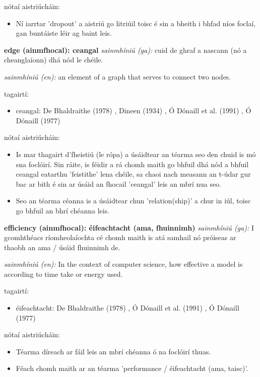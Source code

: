 \documentclass{article}
\begin{document}
nótaí aistriúcháin:
\begin{itemize}
	\item Ní iarrtar 'dropout' a aistriú go litriúil toisc é sin a bheith i bhfad níos foclaí, gan buntáiste léir ag baint leis.
\end{itemize}


\textbf{edge (ainmfhocal): ceangal}
\textit{sainmhíniú (ga):} cuid de ghraf a nascann (nó a cheanglaíonn) dhá nód le chéile.

\textit{sainmhíniú (en):} an element of a graph that serves to connect two nodes.

tagairtí:
\begin{itemize}
	\item ceangal: De Bhaldraithe (1978) \cite{de-bhaldraithe}, Dineen (1934) \cite{dineen}, Ó Dónaill et al. (1991) \cite{focloir-beag}, Ó Dónaill (1977) \cite{odonaill}
\end{itemize}

nótaí aistriúcháin:
\begin{itemize}
	\item Is mar thagairt d'fheistiú (le rópa) a úsáidtear an téarma seo den chuid is mó sna foclóirí. Sin ráite, is féidir a rá chomh maith go bhfuil dhá nód a bhfuil ceangal eatarthu 'feistithe' lena chéile, sa chaoi nach measann an t-údar gur bac ar bith é sin ar úsáid an fhocail 'ceangal' leis an mbrí nua seo.
	\item Seo an téarma céanna is a úsáidtear chun 'relation(ship)' a chur in iúl, toisc go bhfuil an bhrí chéanna leis.
\end{itemize}


\textbf{efficiency (ainmfhocal): éifeachtacht (ama, fhuinnimh)}
\textit{sainmhíniú (ga):} I gcomhthéacs ríomheolaíochta cé chomh maith is atá samhail nó próiseas ar thaobh an ama / úsáid fhuinnimh de.

\textit{sainmhíniú (en):} In the context of computer science, how effective a model is according to time take or energy used.

tagairtí:
\begin{itemize}
	\item éifeachtacht: De Bhaldraithe (1978) \cite{de-bhaldraithe}, Ó Dónaill et al. (1991) \cite{focloir-beag}, Ó Dónaill (1977) \cite{odonaill}
\end{itemize}

nótaí aistriúcháin:
\begin{itemize}
	\item Téarma díreach ar fáil leis an mbrí chéanna ó na foclóirí thuas.
	\item Féach chomh maith ar an téarma 'performance / éifeachtacht (ama, taisc)'.
\end{itemize}
\end{document}

